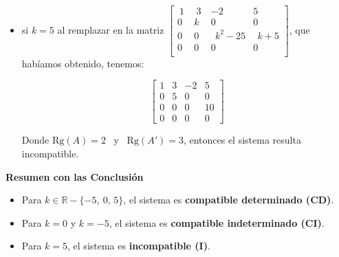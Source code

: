 \documentclass[11pt]{article}
\newcommand{\R}{\mathbb{R}}
\begin{document}
\begin{enumerate}[\hspace{-5mm} 1) ]
\begin{enumerate}[a)]
\begin{itemize}
\begin{itemize}
$$
    \left[\begin{array}{rrc|c}
1 & 3 & -2 & 5\\
0 & -5 & 0 & 0\\
0 & 0 & 0 & 0 \\
0 & 0 & 0 & 0
\end{array}
\right]   
$$

 
Donde $ \text{Rg}(A) = \text{Rg}(A')= 2$ y el sistema resulta  Compatible indeterminado. 

\item si $k=5$ al remplazar en la  matriz  $
    \left[\begin{smallmatrix}
\  1 \   &\  3\  & -2 & 5\\[1mm]
0 & k & 0 & 0\\[1mm]
0 & 0 & \ \ k^2-25 & \ \ k+5\\[1mm]
0 & 0 & 0 & 0\\
\end{smallmatrix}
\right]  
$, que habíamos obtenido, tenemos: 

$$
    \left[\begin{array}{rrc|c}
1 & 3 & -2 & 5\\
0 & 5 & 0 & 0\\
0 & 0 & 0 & 10 \\
0 & 0 & 0 & 0
\end{array}
\right]   
$$

 
Donde $ \text{Rg}(A) =2 $ \ y \ $ \text{Rg}(A')= 3$, entonces  el sistema resulta  incompatible. 


\end{itemize}
\textbf{Resumen con las Conclusión}
\begin{itemize}
    \item Para $k \in \R -\{-5, \ 0, \, 5\}$, el sistema es \textbf{compatible determinado (CD)}.
    \item Para $k = 0$ y $k=-5$, el sistema es \textbf{compatible indeterminado (CI)}.
    \item Para $k = 5$, el sistema es \textbf{incompatible (I)}.
\end{itemize}

\end{itemize}


















\end{enumerate}
\end{enumerate}
\end{document}
